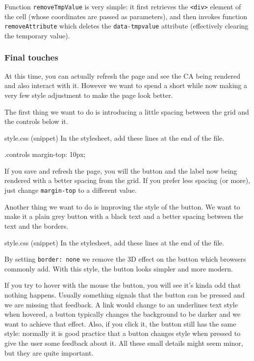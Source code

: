 Function \texttt{removeTmpValue} is very simple: it first retrieves the \texttt{<div>} element of the cell
(whose coordinates are passed as parameters), and then invokes function \texttt{removeAttribute} which
deletes the \texttt{data-tmpvalue} attribute (effectively clearing the temporary value).

\subsubsection{Final touches}
At this time, you can actually refresh the page and see the CA being rendered and also interact with it.
However we want to spend a short while now making a very few style adjustment to make the page look better.

The first thing we want to do is introducing a little spacing between the grid and the controls below it.

\begin{programcode}{style.css (snippet)}
In the stylesheet, add these lines at the end of the file.
\begin{codecss}
.controls {
  margin-top: 10px;
}
\end{codecss}
\end{programcode}

If you save and refresh the page, you will the button and the label now being rendered with a better
spacing from the grid. If you prefer less spacing (or more), just change \texttt{margin-top} to a different
value.

Another thing we want to do is improving the style of the button. We want to make it a plain grey button
with a black text and a better spacing between the text and the borders.

\begin{programcode}{style.css (snippet)}
In the stylesheet, add these lines at the end of the file.
\end{programcode}

By setting \texttt{border: none} we remove the 3D effect on the button which browsers commonly add.
With this style, the button looks simpler and more modern.

If you try to hover with the mouse the button, you will see it's kinda odd that nothing happens. Usually
something signals that the button can be pressed and we are missing that feedback. A link would change to
an underlines text style when hovered, a button typically changes the background to be darker and we want to
achieve that effect. Also, if you click it, the button still has the same style: normally it is good
practice that a button changes style when pressed to give the user some feedback about it. All these
small details might seem minor, but they are quite important.

